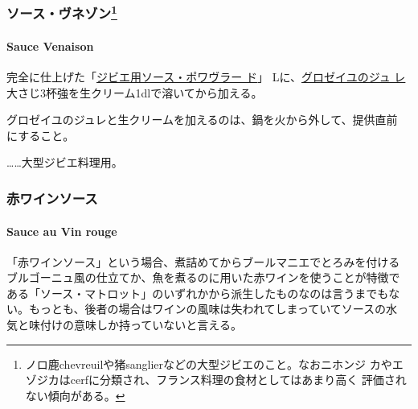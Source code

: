 \begin{recette}
\maeaki

\hypertarget{ux30bdux30fcux30b9ux30f4ux30cdux30beux30f395}{%
\subsubsection[ソース・ヴネゾン]{\texorpdfstring{ソース・ヴネゾン\footnote{ノロ鹿chevreuilや猪sanglierなどの大型ジビエのこと。なおニホンジ
  カやエゾジカはcerfに分類され、フランス料理の食材としてはあまり高く
  評価されない傾向がある。}}{ソース・ヴネゾン}}\label{ux30bdux30fcux30b9ux30f4ux30cdux30beux30f395}}

\hypertarget{sauce-venaison}{%
\paragraph{Sauce Venaison}\label{sauce-venaison}}

完全に仕上げた「\protect\hyperlink{sauce-poivrade-pour-gibier}{ジビエ用ソース・ポワヴラー
ド}」\troisquarts{} Lに、\protect\hyperlink{}{グロゼイユのジュ
レ}大さじ3杯強を生クリーム1dlで溶いてから加える。

グロゼイユのジュレと生クリームを加えるのは、鍋を火から外して、提供直前
にすること。

\ldots{}\ldots{}大型ジビエ料理用。

\maeaki

\hypertarget{ux8d64ux30efux30a4ux30f3ux30bdux30fcux30b9}{%
\subsubsection{赤ワインソース}\label{ux8d64ux30efux30a4ux30f3ux30bdux30fcux30b9}}

\hypertarget{sauce-au-vin-rouge}{%
\paragraph{Sauce au Vin rouge}\label{sauce-au-vin-rouge}}

  

「赤ワインソース」という場合、煮詰めてからブールマニエでとろみを付ける
ブルゴーニュ風の仕立てか、魚を煮るのに用いた赤ワインを使うことが特徴で
ある「ソース・マトロット」のいずれかから派生したものなのは言うまでもな
い。もっとも、後者の場合はワインの風味は失われてしまっていてソースの水
気と味付けの意味しか持っていないと言える。


\end{recette}
